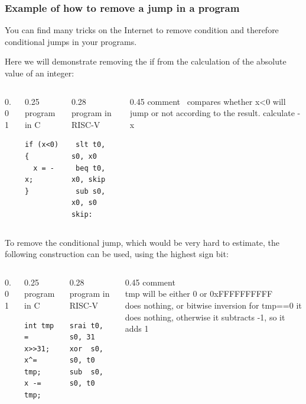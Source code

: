 \documentclass{beamer}
\begin{document}
\begin{frame}[fragile]
\frametitle{Example of how to remove a jump in a program}

You can find many tricks on the Internet to remove condition and therefore conditional jumps in your programs.

Here we will demonstrate removing the if from the calculation of the absolute value of an integer:

\begin{columns}[T]
\begin{column}{0.01\textwidth}
\phantom{x}
\end{column}
\begin{column}{0.25\textwidth}
program in C
\begin{verbatim}
if (x<0) {
  x = -x;
}
\end{verbatim}
\end{column}

\begin{column}{0.28\textwidth}
program in RISC-V
\begin{verbatim}
 slt t0, s0, x0
 beq t0, x0, skip
 sub s0, x0, s0
skip:
\end{verbatim}
\end{column}
\begin{column}{0.45\textwidth}
\phantom{x}comment\
\small
compares whether x<0
will jump or not according to the result.
calculate -x
\end{column}
\end{columns}
\bigskip

To remove the conditional jump, which would be very hard to estimate, the following construction can be used, using the highest sign bit:
\begin{columns}[T]
\begin{column}{0.01\textwidth}
\phantom{x}
\end{column}
\begin{column}{0.25\textwidth}
program in C
\begin{verbatim}
int tmp = x>>31;
x^= tmp;
x -= tmp;
\end{verbatim}
\end{column}

\begin{column}{0.28\textwidth}
program in RISC-V
\begin{verbatim}
srai t0, s0, 31
xor  s0, s0, t0
sub  s0, s0, t0
\end{verbatim}
\end{column}
\begin{column}{0.45\textwidth}
\phantom{x}comment\\
\small
tmp will be either 0 or 0xFFFFFFFFFF\\
does nothing, or bitwise inversion
for tmp==0 it does nothing, otherwise it subtracts -1, so it adds 1
\end{column}
\end{columns}
\end{frame}
\end{document}
